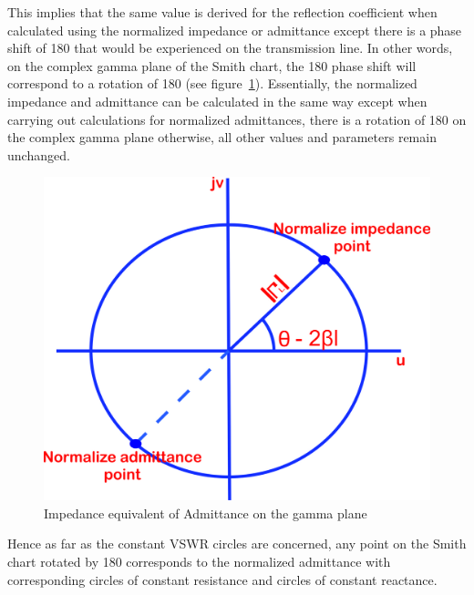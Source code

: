 This implies that the same value is derived for the reflection coefficient when calculated using the normalized impedance or admittance except there is a phase shift of 180\textdegree\; that would be experienced on the transmission line. In other words, on the complex gamma plane of the Smith chart, the 180\textdegree\; phase shift will correspond to a rotation of 180\textdegree\; (see figure~\ref{fig:zstyuiou}). Essentially, the normalized impedance and admittance can be calculated in the same way except when carrying out calculations for normalized admittances, there is a rotation of 180\textdegree\; on the complex gamma plane otherwise, all other values and parameters remain unchanged.
\begin{figure}[h]
\centering
\includegraphics[width=0.6\linewidth]{graphics/zstyuiou}
\caption{Impedance equivalent of Admittance on the gamma plane}
\label{fig:zstyuiou}
\end{figure}

Hence as far as the constant VSWR circles are concerned, any point on the Smith chart rotated by 180\textdegree\; corresponds to the normalized admittance with corresponding circles of constant resistance and circles of constant reactance. 

